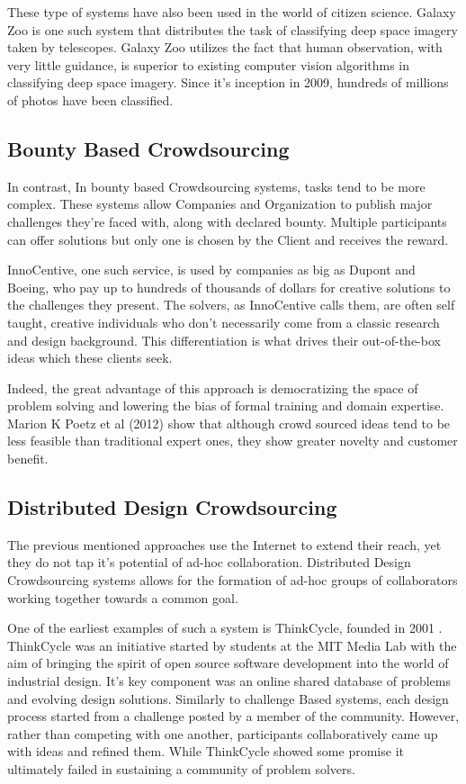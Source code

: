 These type of systems have also been used in the world of citizen science\cite{sauermann2015crowd}. Galaxy Zoo\cite{galaxyzoo} is one such system that distributes the task of classifying deep space imagery taken by telescopes. Galaxy Zoo utilizes the fact that human observation, with very little guidance, is superior to existing computer vision algorithms in classifying deep space imagery. Since it's inception in 2009, hundreds of millions of photos have been classified. 

\subsection{Bounty Based Crowdsourcing}

In contrast, In bounty based Crowdsourcing systems, tasks tend to be more complex. These systems allow Companies and Organization to publish major challenges they're faced with, along with declared bounty. Multiple participants can offer solutions but only one is chosen by the Client and receives the reward.   

InnoCentive\cite{innocentive}, one such service, is used by companies as big as Dupont and Boeing, who pay up to hundreds of thousands of dollars for creative solutions to the challenges they present. The solvers, as InnoCentive calls them, are often self taught, creative individuals who don't necessarily come from a classic research and design background. This differentiation is what drives their out-of-the-box ideas which these clients seek. \cite{howe2006rise}

Indeed, the great advantage of this approach is democratizing the space of problem solving and lowering the bias of formal training and domain expertise. Marion K Poetz et al (2012)\cite{poetz2012value} show that although crowd sourced ideas tend to be less feasible than traditional expert ones, they show greater novelty and customer benefit. 

\subsection{Distributed Design Crowdsourcing}

The previous mentioned approaches use the Internet to extend their reach, yet they do not tap it's potential of ad-hoc collaboration. Distributed Design Crowdsourcing systems allows for the formation of ad-hoc groups of collaborators working together towards a common goal.  

One of the earliest examples of such a system is ThinkCycle, founded in 2001 \cite{sawhney2002thinkcycle}. ThinkCycle was an initiative started by students at the MIT Media Lab with the aim of bringing the spirit of open source software development into the world of industrial design. It’s key component was an online shared database of problems and evolving design solutions. Similarly to challenge Based systems, each design process started from a challenge posted by a member of the community. However, rather than competing with one another, participants collaboratively came up with ideas and refined them. While ThinkCycle showed some promise it ultimately failed in sustaining a community of problem solvers.

